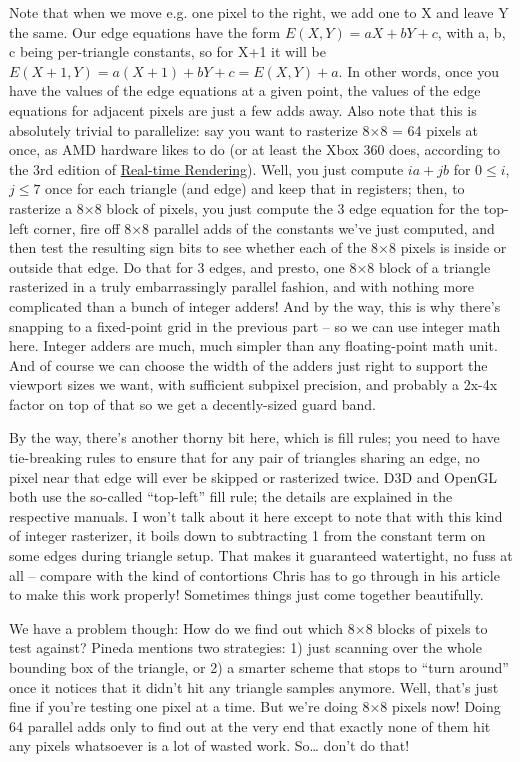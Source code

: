 \documentclass[12pt]{article}
\begin{document}
Note that when we move e.g. one pixel to the right, we add one to X and leave Y the same. Our edge equations have the form \(E(X,Y) = aX + bY + c\), with a, b, c being per-triangle constants, so for X+1 it will be \(E(X+1,Y) = a(X+1) + bY + c = E(X,Y) + a\). In other words, once you have the values of the edge equations at a given point, the values of the edge equations for adjacent pixels are just a few adds away. Also note that this is absolutely trivial to parallelize: say you want to rasterize 8×8 = 64 pixels at once, as AMD hardware likes to do (or at least the Xbox 360 does, according to the 3rd edition of \href{http://realtimerendering.com/book.html}{Real-time Rendering}). Well, you just compute \(ia + jb\) for \(0 \le i\), \(j \le 7\) once for each triangle (and edge) and keep that in registers; then, to rasterize a 8×8 block of pixels, you just compute the 3 edge equation for the top-left corner, fire off 8×8 parallel adds of the constants we’ve just computed, and then test the resulting sign bits to see whether each of the 8×8 pixels is inside or outside that edge. Do that for 3 edges, and presto, one 8×8 block of a triangle rasterized in a truly embarrassingly parallel fashion, and with nothing more complicated than a bunch of integer adders! And by the way, this is why there’s snapping to a fixed-point grid in the previous part – so we can use integer math here. Integer adders are much, much simpler than any floating-point math unit. And of course we can choose the width of the adders just right to support the viewport sizes we want, with sufficient subpixel precision, and probably a 2x-4x factor on top of that so we get a decently-sized guard band.

By the way, there’s another thorny bit here, which is fill rules; you need to have tie-breaking rules to ensure that for any pair of triangles sharing an edge, no pixel near that edge will ever be skipped or rasterized twice. D3D and OpenGL both use the so-called “top-left” fill rule; the details are explained in the respective manuals. I won’t talk about it here except to note that with this kind of integer rasterizer, it boils down to subtracting 1 from the constant term on some edges during triangle setup. That makes it guaranteed watertight, no fuss at all – compare with the kind of contortions Chris has to go through in his article to make this work properly! Sometimes things just come together beautifully.

We have a problem though: How do we find out which 8×8 blocks of pixels to test against? Pineda mentions two strategies: 1) just scanning over the whole bounding box of the triangle, or 2) a smarter scheme that stops to “turn around” once it notices that it didn’t hit any triangle samples anymore. Well, that’s just fine if you’re testing one pixel at a time. But we’re doing 8×8 pixels now! Doing 64 parallel adds only to find out at the very end that exactly none of them hit any pixels whatsoever is a lot of wasted work. So… don’t do that!
\end{document}
